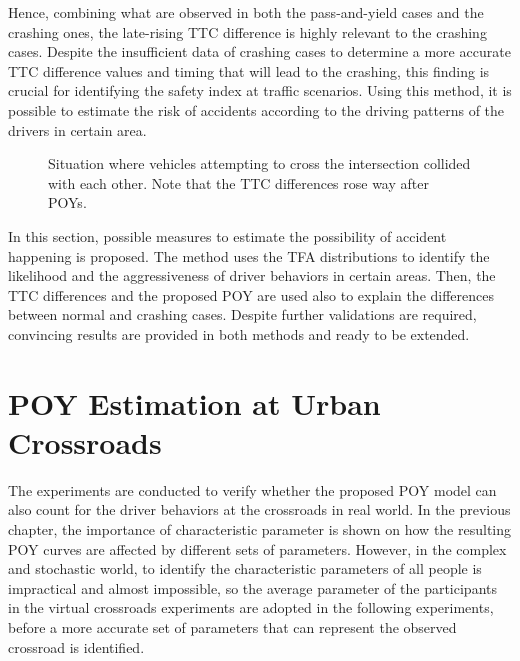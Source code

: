 Hence, combining what are observed in both the pass-and-yield cases and the crashing ones, the late-rising TTC difference is highly relevant to the crashing cases. Despite the insufficient data of crashing cases to determine a more accurate TTC difference values and timing that will lead to the crashing, this finding is crucial for identifying the safety index at traffic scenarios. Using this method, it is possible to estimate the risk of accidents according to the driving patterns of the drivers in certain area.


\begin{figure}[htbp!]
\begin{center}
\end{center}
\caption{Situation where vehicles attempting to cross the intersection collided with each other. Note that the TTC differences rose way after POYs.}
\label{fig:accident004} 
\end{figure}

In this section, possible measures to estimate the possibility of accident happening is proposed. The method uses the TFA distributions to identify the likelihood and the aggressiveness of driver behaviors in certain areas. Then, the TTC differences and the proposed POY are used also to explain the differences between normal and crashing cases. Despite further validations are required, convincing results are provided in both methods and ready to be extended.

\section{POY Estimation at Urban Crossroads}
\label{sec:POY_realCross}

The experiments are conducted to verify whether the proposed POY model can also count for the driver behaviors at the crossroads in real world. In the previous chapter, the importance of characteristic parameter is shown on how the resulting POY curves are affected by different sets of parameters. However, in the complex and stochastic world, to identify the characteristic parameters of all people is impractical and almost impossible, so the average parameter of the participants in the virtual crossroads experiments are adopted in the following experiments, before a more accurate set of parameters that can represent the observed crossroad is identified.

